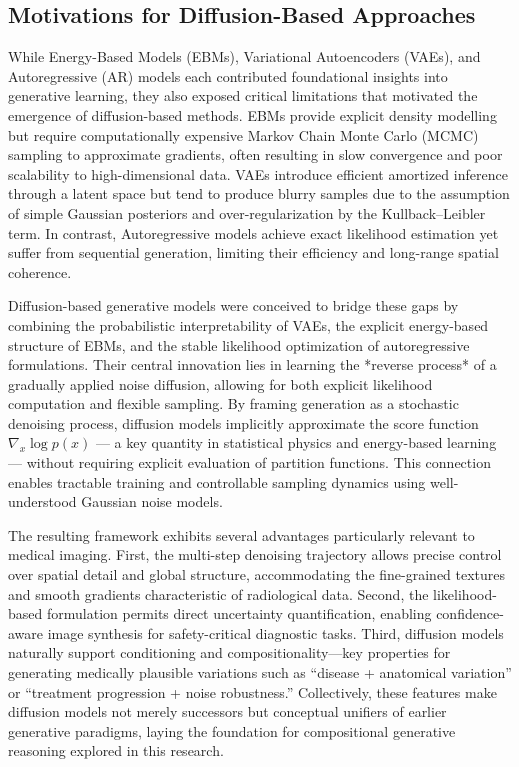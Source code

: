 \subsection{Motivations for Diffusion-Based Approaches}

While Energy-Based Models (EBMs), Variational Autoencoders (VAEs), and Autoregressive (AR) models each contributed foundational insights into generative learning, they also exposed critical limitations that motivated the emergence of diffusion-based methods. EBMs provide explicit density modelling but require computationally expensive Markov Chain Monte Carlo (MCMC) sampling to approximate gradients, often resulting in slow convergence and poor scalability to high-dimensional data. VAEs introduce efficient amortized inference through a latent space but tend to produce blurry samples due to the assumption of simple Gaussian posteriors and over-regularization by the Kullback–Leibler term. In contrast, Autoregressive models achieve exact likelihood estimation yet suffer from sequential generation, limiting their efficiency and long-range spatial coherence.  

\vspace{1em}

Diffusion-based generative models were conceived to bridge these gaps by combining the probabilistic interpretability of VAEs, the explicit energy-based structure of EBMs, and the stable likelihood optimization of autoregressive formulations. Their central innovation lies in learning the *reverse process* of a gradually applied noise diffusion, allowing for both explicit likelihood computation and flexible sampling. By framing generation as a stochastic denoising process, diffusion models implicitly approximate the score function \( \nabla_x \log p(x) \) — a key quantity in statistical physics and energy-based learning — without requiring explicit evaluation of partition functions. This connection enables tractable training and controllable sampling dynamics using well-understood Gaussian noise models.  

\vspace{1em}

The resulting framework exhibits several advantages particularly relevant to medical imaging. First, the multi-step denoising trajectory allows precise control over spatial detail and global structure, accommodating the fine-grained textures and smooth gradients characteristic of radiological data. Second, the likelihood-based formulation permits direct uncertainty quantification, enabling confidence-aware image synthesis for safety-critical diagnostic tasks. Third, diffusion models naturally support conditioning and compositionality—key properties for generating medically plausible variations such as “disease + anatomical variation” or “treatment progression + noise robustness.” Collectively, these features make diffusion models not merely successors but conceptual unifiers of earlier generative paradigms, laying the foundation for compositional generative reasoning explored in this research.  

